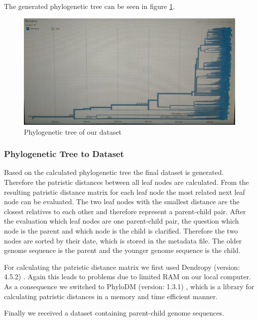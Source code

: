 The generated phylogenetic tree can be seen in figure \ref{phylogeneticTree}.

\begin{figure}[ht]
	\centering
	\includegraphics[width=1.0\linewidth]{figures/phylogeneticTree.jpg}
	\caption{Phylogenetic tree of our dataset \cite{own representation}}
	\label{phylogeneticTree}
\end{figure}

\subsubsection{Phylogenetic Tree to Dataset} \label{approachAc}

Based on the calculated phylogenetic tree the final dataset is generated. Therefore the patristic distances between all leaf nodes are calculated. From the resulting patristic distance matrix for each leaf node the most related next leaf node can be evaluated. The two leaf nodes with the smallest distance are the closest relatives to each other and therefore represent a parent-child pair. After the evaluation which leaf nodes are one parent-child pair, the question which node is the parent and which node is the child is clarified. Therefore the two nodes are sorted by their date, which is stored in the metadata file. The older genome sequence is the parent and the younger genome sequence is the child.

For calculating the patristic distance matrix we first used Dendropy (version: 4.5.2) \cite{DendroPyPhylogeneticComputing}. Again this leads to problems due to limited RAM on our local computer. As a consequence we switched to PhyloDM (version: 1.3.1) \cite{aaron_mussig_2020_4089111}, which is a library for calculating patristic distances in a memory and time efficient manner.

Finally we received a dataset containing parent-child genome sequences.

